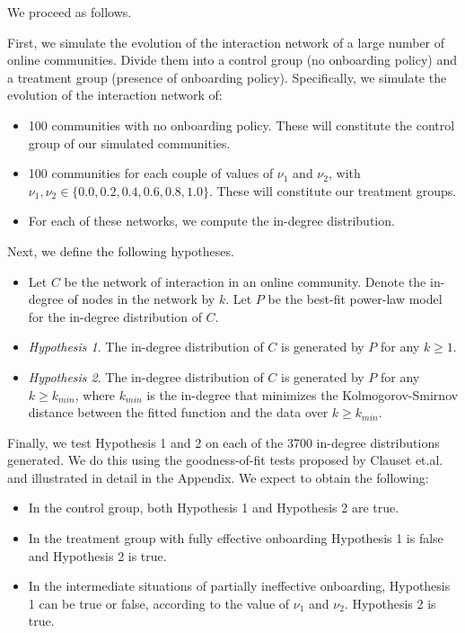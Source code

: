 \documentclass{nws}
\begin{document}
We proceed as follows.

First, we simulate the evolution of the interaction network of a large number of online communities. Divide them into a control group (no onboarding policy) and a treatment group (presence of onboarding policy). Specifically, we simulate the evolution of the interaction network of:

\begin{itemize}
\item 100 communities with no onboarding policy. These will constitute the control group of our simulated communities. 
\item 100 communities for each couple of values of $\nu_1$  and $\nu_2$, with $\nu_1, \nu_2 \in \{0.0, 0.2, 0.4, 0.6, 0.8, 1.0\}$. These will constitute our treatment groups.
\item For each of these networks, we compute the in-degree distribution.
\end{itemize}

Next, we define the following hypotheses. 

\begin{itemize}
\item Let $C$ be the network of interaction in an online community. Denote the in-degree of nodes in the network by $k$. Let $P$ be the best-fit power-law model for the in-degree distribution of $C$.
\item \emph{Hypothesis 1}. The in-degree distribution of $C$ is generated by $P$ for any $k \geq 1$.
\item \emph{Hypothesis 2}. The in-degree distribution of $C$ is generated by $P$ for any $k \geq k_{min}$, where $k_{min}$ is the in-degree that minimizes the Kolmogorov-Smirnov distance between the fitted function and the data over $k \geq k_{min}$.
\end{itemize}

Finally, we test Hypothesis 1 and 2 on each of the 3700 in-degree distributions generated. We do this using the goodness-of-fit tests proposed by Clauset et.al. \cite{clauset2009power} and illustrated in detail in the Appendix. We expect to obtain the following:

\begin{itemize}
\item In the control group, both Hypothesis 1 and Hypothesis 2 are true. 
\item In the treatment group with fully effective onboarding Hypothesis 1 is false and Hypothesis 2 is true. 
\item In the intermediate situations of partially ineffective onboarding, Hypothesis 1 can be true or false, according to the value of $\nu_1$ and $\nu_2$. Hypothesis 2 is true.
\end{itemize}
\end{document}
